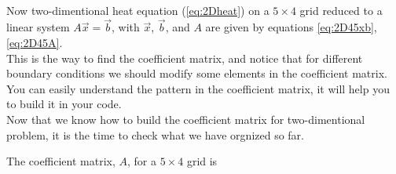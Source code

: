 \\ 
Now two-dimentional heat equation (\ref{eq:2Dheat}) on a $5 \times 4$ grid reduced to a linear system $A\vec{x}=\vec{b}$, with  $\vec{x}$, $\vec{b}$, and $A$ are given by equations \ref{eq:2D45xb}, \ref{eq:2D45A}. 
\\
This is the way to find the coefficient matrix, and notice that for different boundary conditions we should modify some elements in the coefficient matrix. You can easily understand the pattern in the coefficient matrix, it will help you to build it in your code.
\\
Now that we know how to build the coefficient matrix for two-dimentional problem, it is the time to check what we have orgnized so far. 

\pagebreak

\begin{landscape}%
\begin{flushleft}
 	The coefficient matrix, $A$, for a $5 \times 4$ grid is
\end{flushleft}


\end{landscape}
